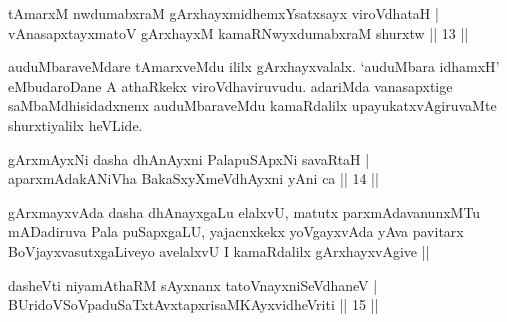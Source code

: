 \begin{shl}
tAmarxM nwdumabxraM gArxhayxmidhemxYsatxsayx viroVdhataH | \\
vAnasapxtayxmatoV gArxhayxM kamaRNwyxdumabxraM shurxtw \hfill|| 13 || 
\end{shl}

\begin{artha}
auduMbaraveMdare tAmarxveMdu ililx gArxhayxvalalx. `auduMbara idhamxH' eMbudaroDane A athaRkekx viroVdhaviruvudu. adariMda vanasapxtige saMbaMdhisidadxnenx auduMbaraveMdu kamaRdalilx upayukatxvAgiruvaMte shurxtiyalilx heVLide.
\end{artha}


\begin{shl}
gArxmAyxNi dasha dhAnAyxni PalapuSApxNi savaRtaH | \\
aparxmAdakANiVha BakaSxyXmeVdhAyxni yAni ca \hfill|| 14 || 
\end{shl}

\begin{artha}
gArxmayxvAda dasha dhAnayxgaLu elalxvU, matutx parxmAdavanunxMTu mADadiruva Pala puSapxgaLU, yajacnxkekx yoVgayxvAda yAva pavitarx BoVjayxvasutxgaLiveyo avelalxvU I kamaRdalilx gArxhayxvAgive ||
\end{artha}


\begin{shl}
dasheVti niyamAthaRM sAyxnanx tatoV\s nayxniSeVdhaneV | \\
BUridoVSoVpaduSaTxtAvxtapxrisaMKAyxvidheVriti \hfill|| 15 || 
\end{shl}

